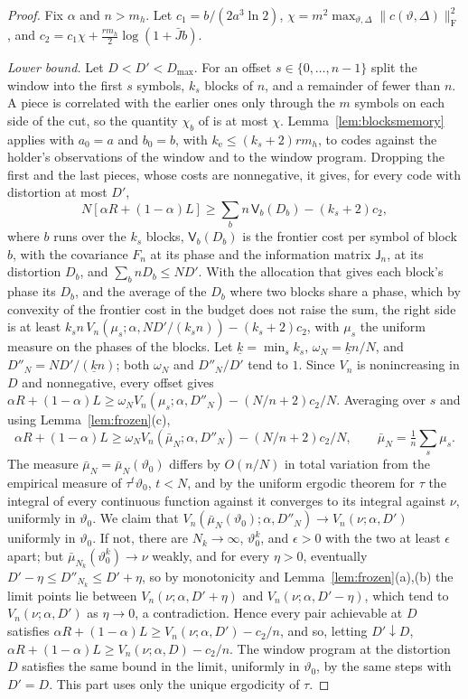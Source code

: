 \documentclass[11pt,onecolumn]{IEEEtran}
\begin{document}
\begin{proof}
Fix $\alpha$ and $n>m_h$. Let $c_1=b/(2a^3\ln2)$,
$\chi=m^2\max_{\vartheta,\Delta}\|c(\vartheta,\Delta)\|_{\mathrm F}^2$, and
$c_2=c_1\chi+\tfrac{rm_h}2\log(1+\bar Jb)$.

\emph{Lower bound.} Let $D<D'<D_{\max}$. For an offset
$s\in\{0,\dots,n-1\}$ split the window into the first $s$ symbols, $k_s$
blocks of $n$, and a remainder of fewer than $n$. A piece is correlated
with the earlier ones only through the $m$ symbols on each side of the
cut, so the quantity $\chi_b$ of \cite[Lemma~10]{part3} is at most $\chi$.
Lemma~\ref{lem:blocksmemory} applies with $a_0=a$ and $b_0=b$, with
$k_{\mathrm e}\le(k_s+2)rm_h$, to codes against the holder's observations of
the window and to the window program. Dropping the first and the last
pieces, whose costs are nonnegative, it gives, for every code with
distortion at most $D'$,
\[
N[\alpha R+(1-\alpha)L]\ge\sum_{b}n\,\mathsf V_b(D_b)-(k_s+2)c_2,
\]
where $b$ runs over the $k_s$ blocks, $\mathsf V_b(D_b)$ is the frontier
cost per symbol of block $b$, with the covariance $F_n$ at its phase and
the information matrix $\mathsf J_n$, at its distortion $D_b$, and
$\sum_bnD_b\le ND'$. With the allocation that gives each block's phase
its $D_b$, and the average of the $D_b$ where two blocks share a phase,
which by convexity of the frontier cost in the budget does not raise the
sum, the right side is at least
$k_sn\,V_n(\mu_s;\alpha,ND'/(k_sn))-(k_s+2)c_2$, with $\mu_s$ the uniform
measure on the phases of the blocks. Let $\underline k=\min_sk_s$,
$\omega_N=\underline kn/N$, and $D''_N=ND'/(\underline kn)$; both $\omega_N$
and $D''_N/D'$ tend to $1$. Since $V_n$ is nonincreasing in $D$ and
nonnegative, every offset gives
$\alpha R+(1-\alpha)L\ge\omega_NV_n(\mu_s;\alpha,D''_N)-(N/n+2)c_2/N$.
Averaging over $s$ and using Lemma~\ref{lem:frozen}(c),
\[
\alpha R+(1-\alpha)L\ge\omega_NV_n(\bar\mu_N;\alpha,D''_N)-(N/n+2)c_2/N,\qquad
\bar\mu_N=\tfrac1n\sum_s\mu_s .
\]
The measure $\bar\mu_N=\bar\mu_N(\vartheta_0)$ differs by $O(n/N)$ in total
variation from the empirical measure of $\tau^t\vartheta_0$, $t<N$, and by
the uniform ergodic theorem \cite{oxtoby1952} for $\tau$ the integral of
every continuous function against it converges to its integral against
$\nu$, uniformly in $\vartheta_0$. We claim that
$V_n(\bar\mu_N(\vartheta_0);\alpha,D''_N)\to V_n(\nu;\alpha,D')$ uniformly in
$\vartheta_0$. If not, there are $N_k\to\infty$, $\vartheta_0^k$, and
$\epsilon>0$ with the two at least $\epsilon$ apart; but
$\bar\mu_{N_k}(\vartheta_0^k)\to\nu$ weakly, and for every $\eta>0$, eventually
$D'-\eta\le D''_{N_k}\le D'+\eta$, so by monotonicity and
Lemma~\ref{lem:frozen}(a),(b) the limit points lie between
$V_n(\nu;\alpha,D'+\eta)$ and $V_n(\nu;\alpha,D'-\eta)$, which tend to
$V_n(\nu;\alpha,D')$ as $\eta\to0$, a contradiction. Hence every pair
achievable at $D$ satisfies
$\alpha R+(1-\alpha)L\ge V_n(\nu;\alpha,D')-c_2/n$, and so, letting
$D'\downarrow D$, $\alpha R+(1-\alpha)L\ge V_n(\nu;\alpha,D)-c_2/n$. The window
program at the distortion $D$ satisfies the same bound in the limit,
uniformly in $\vartheta_0$, by the same steps with $D'=D$. This part uses
only the unique ergodicity of $\tau$.


\end{proof}
\end{document}
